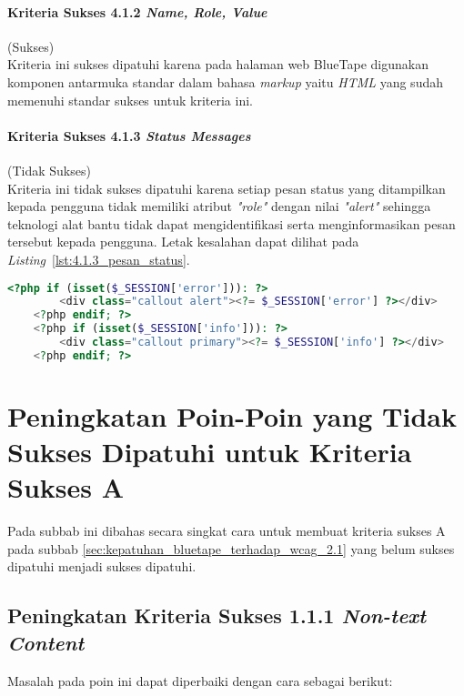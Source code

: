 \paragraph{Kriteria Sukses 4.1.2 \textit{Name, Role, Value}}
\label{par:kepatuhan_bluetape_kriteria_sukses_4.1.2}
(Sukses)\\

Kriteria ini sukses dipatuhi karena pada halaman web BlueTape digunakan komponen antarmuka standar dalam bahasa \textit{markup} yaitu \textit{HTML} yang sudah memenuhi standar sukses untuk kriteria ini.

\paragraph{Kriteria Sukses 4.1.3 \textit{Status Messages}}
\label{par:kepatuhan_bluetape_kriteria_sukses_4.1.3}
(Tidak Sukses)\\

Kriteria ini tidak sukses dipatuhi karena setiap pesan status yang ditampilkan kepada pengguna tidak memiliki atribut \textit{"role"} dengan nilai \textit{"alert"} sehingga teknologi alat bantu tidak dapat mengidentifikasi serta menginformasikan pesan tersebut kepada pengguna. Letak kesalahan dapat dilihat pada \mbox{\textit{Listing} \ref{lst:4.1.3_pesan_status}}.

\begin{lstlisting}[frame=single, label={lst:4.1.3_pesan_status}, language=PHP, caption=Pelanggaran Kriteria Sukses 4.1.3 pada Bagian Pesan Status]
    <?php if (isset($_SESSION['error'])): ?>
        <div class="callout alert"><?= $_SESSION['error'] ?></div>
    <?php endif; ?>
    <?php if (isset($_SESSION['info'])): ?>
        <div class="callout primary"><?= $_SESSION['info'] ?></div>
    <?php endif; ?>
\end{lstlisting}

\section{Peningkatan Poin-Poin yang Tidak Sukses Dipatuhi untuk Kriteria Sukses A}
\label{sec:peningkatan_kriteria_sukses_a}
Pada subbab ini dibahas secara singkat cara untuk membuat kriteria sukses A pada subbab \ref{sec:kepatuhan_bluetape_terhadap_wcag_2.1} yang belum sukses dipatuhi menjadi sukses dipatuhi.

\subsection{Peningkatan Kriteria Sukses 1.1.1 \textit{Non-text Content}}
\label{subsec:peningkatan_kriteria_sukses_1.1.1}
Masalah pada poin ini dapat diperbaiki dengan cara sebagai berikut: 


